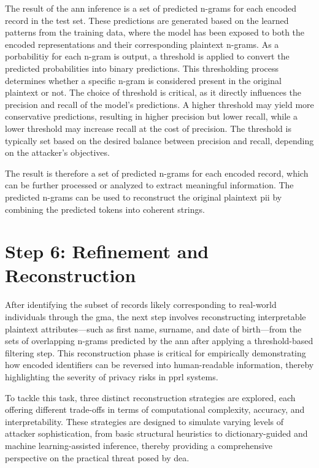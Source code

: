 The result of the \ac{ann} inference is a set of predicted n-grams for each encoded record in the test set.
These predictions are generated based on the learned patterns from the training data, where the model has been exposed to both the encoded representations and their corresponding plaintext n-grams.
As a porbabilitiy for each n-gram is output, a threshold is applied to convert the predicted probabilities into binary predictions.
This thresholding process determines whether a specific n-gram is considered present in the original plaintext or not.
The choice of threshold is critical, as it directly influences the precision and recall of the model's predictions.
A higher threshold may yield more conservative predictions, resulting in higher precision but lower recall, while a lower threshold may increase recall at the cost of precision.
The threshold is typically set based on the desired balance between precision and recall, depending on the attacker's objectives.

The result is therefore a set of predicted n-grams for each encoded record, which can be further processed or analyzed to extract meaningful information.
The predicted n-grams can be used to reconstruct the original plaintext \ac{pii} by combining the predicted tokens into coherent strings.

\section{Step 6: Refinement and Reconstruction} \label{sec:refinementandreconstruction}

After identifying the subset of records likely corresponding to real-world individuals through the \ac{gma}, the next step involves reconstructing interpretable plaintext attributes—such as first name, surname, and date of birth—from the sets of overlapping n-grams predicted by the \ac{ann} after applying a threshold-based filtering step.
This reconstruction phase is critical for empirically demonstrating how encoded identifiers can be reversed into human-readable information, thereby highlighting the severity of privacy risks in \ac{pprl} systems.

To tackle this task, three distinct reconstruction strategies are explored, each offering different trade-offs in terms of computational complexity, accuracy, and interpretability.
These strategies are designed to simulate varying levels of attacker sophistication, from basic structural heuristics to dictionary-guided and machine learning-assisted inference, thereby providing a comprehensive perspective on the practical threat posed by \ac{dea}.

